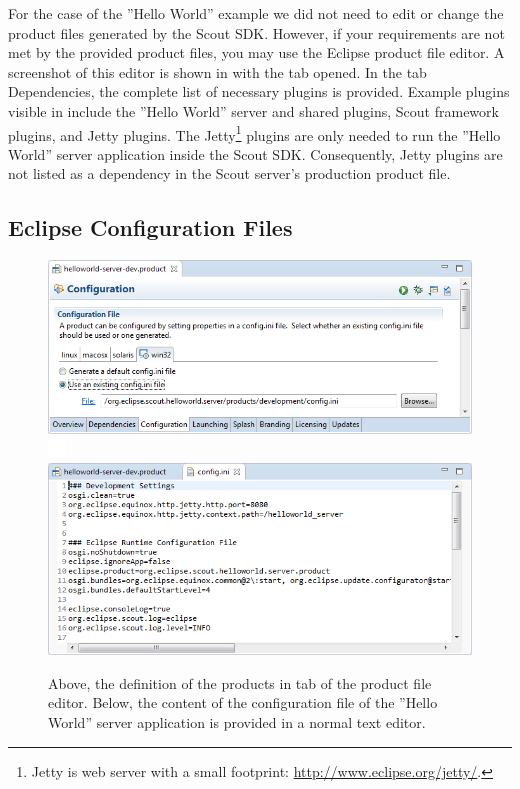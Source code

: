 \documentclass[a4paper,10pt,twoside]{book}
\begin{document}
For the case of the ''Hello World'' example we did not need to edit or change the product files generated by the Scout SDK. 
However, if your requirements are not met by the provided product files, you may use the Eclipse product file editor.
A screenshot of this editor is shown in  with the tab  opened.
In the tab Dependencies, the complete list of necessary plugins is provided.
Example plugins visible in  include the ''Hello World'' server and shared plugins, Scout framework plugins, and Jetty plugins.
The Jetty\footnote{
Jetty is web server with a small footprint: \url{http://www.eclipse.org/jetty/}.
} 
plugins are only needed to run the ''Hello World'' server application inside the Scout SDK.
Consequently, Jetty plugins are not listed as a dependency in the Scout server's production product file.

\subsection{Eclipse Configuration Files}

\begin{figure}
\includegraphics[width=14cm]{sdk_server_dev_product_config.png} \\ 
\includegraphics[height=5mm]{white_pixel.png} \\
\includegraphics[width=14cm]{sdk_server_dev_configini.png} 
\caption{Above, the definition of the products  in tab  of the product file editor.
Below, the content of the configuration file of the ''Hello World'' server application is provided in a normal text editor.
}
\end{figure}
\end{document}
